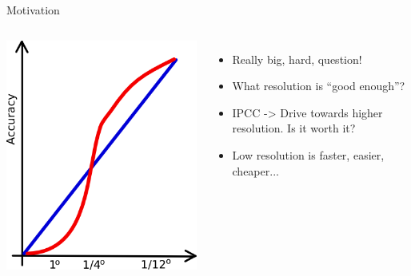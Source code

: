 \documentclass{beamer}
\begin{document}
\begin{frame}{Motivation}
 \begin{columns}[c]
\column{1.5in}
\includegraphics[width=1\textwidth]{accuracy_rez.png}\\
\column{3in}
\begin{itemize}
 \item Really big, hard, question!%
 \item What resolution is ``good enough''?
 \item IPCC -> Drive towards higher resolution. Is it worth it?
 \item Low resolution is faster, easier, cheaper...
\end{itemize}
\end{columns}
\end{frame}
\end{document}
